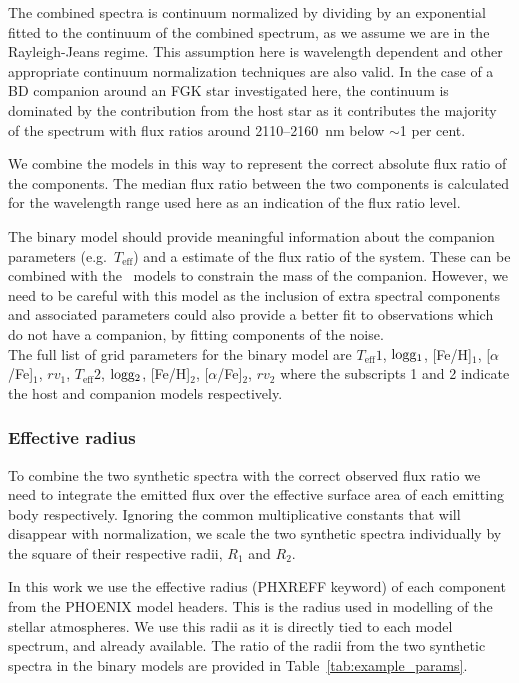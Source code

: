 \documentclass[fleqn,usenatbib]{mnras}
\begin{document}
The combined spectra is continuum normalized by dividing by an exponential fitted to the continuum of the combined spectrum, as we assume we are in the Rayleigh-Jeans regime. This assumption here is wavelength dependent and other appropriate continuum normalization techniques are also valid. In the case of a BD companion around an FGK star investigated here, the continuum is dominated by the contribution from the host star as it contributes the majority of the spectrum with flux ratios around 2110--2160~nm below \(\sim\)1 per cent.

We combine the models in this way to represent the correct absolute flux ratio of the components. The median flux ratio between the two components is calculated for the wavelength range used here as an indication of the flux ratio level.

The binary model should provide meaningful information about the companion parameters (e.g.\ \(T_{\textrm{eff}}\)) and a estimate of the flux ratio of the system. These can be combined with the~\citet{baraffe_evolutionary_2003} models to constrain the mass of the companion. However, we need to be careful with this model as the inclusion of extra spectral components and associated parameters could also provide a better fit to observations which do not have a companion, by fitting components of the noise.\\

{The full list of grid parameters for the binary model are \(T_{\textrm{eff}}1\),  \(\rm logg_1\), [Fe/H]$_1$, [\(\alpha\)/Fe]$_1$, ${rv}_1$, \(T_{\textrm{eff}}2\), \(\rm logg_2\), [Fe/H]$_2$, [\(\alpha\)/Fe]$_2$, ${rv}_2$ where the subscripts 1 and 2 indicate the host and companion models respectively.}

\subsubsection{Effective radius}
\label{subsection-radius}
To combine the two synthetic spectra with the correct observed flux ratio we need to integrate the emitted flux over the effective surface area of each emitting body respectively. Ignoring the common multiplicative constants that will disappear with normalization, we scale the two synthetic spectra individually by the square of their respective radii, \(R_1\) and \(R_2\).

In this work we use the effective radius (PHXREFF keyword) of each component from the PHOENIX model headers. This is the radius used in modelling of the stellar atmospheres. We use this radii as it is directly tied to each model spectrum, and already available. The ratio of the radii from the two synthetic spectra in the binary models are provided in Table~\ref{tab:example_params}.
\end{document}
